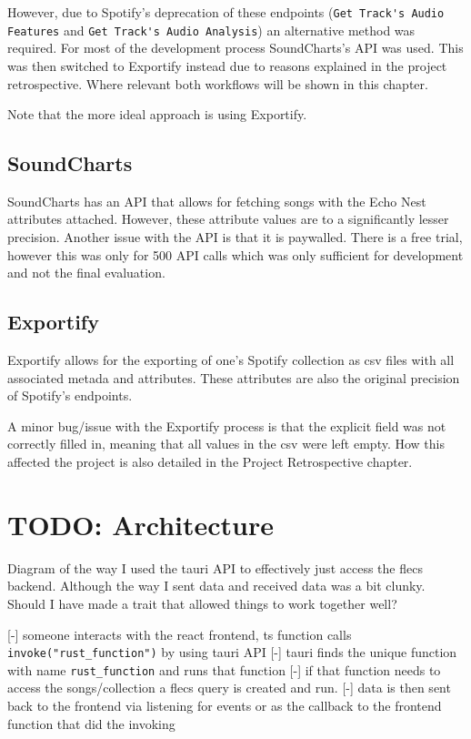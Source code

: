 However, due to Spotify's deprecation of these endpoints (\lstinline|Get Track's Audio Features| and \lstinline|Get Track's Audio Analysis|) an alternative method was required. For most of the development process SoundCharts's API was used. This was then switched to Exportify instead due to reasons explained in the project retrospective. Where relevant both workflows will be shown in this chapter.

Note that the more ideal approach is using Exportify.

\subsection{SoundCharts}
SoundCharts has an API that allows for fetching songs with the Echo Nest attributes attached. However, these attribute values are to a significantly lesser precision. Another issue with the API is that it is paywalled. There is a free trial, however this was only for 500 API calls which was only sufficient for development and not the final evaluation.

\subsection{Exportify}
Exportify allows for the exporting of one's Spotify collection as csv files with all associated metada and attributes. These attributes are also the original precision of Spotify's endpoints.

A minor bug/issue with the Exportify process is that the explicit field was not correctly filled in, meaning that all values in the csv were left empty. How this affected the project is also detailed in the Project Retrospective chapter.

\section{TODO: Architecture}%
Diagram of the way I used the tauri API to effectively just access the flecs backend. Although the way I sent data and received data was a bit clunky. Should I have made a trait that allowed things to work together well?

[-] someone interacts with the react frontend, ts function calls \texttt{invoke("rust\_function")} by using tauri API
[-] tauri finds the unique function with name \texttt{rust\_function} and runs that function
[-] if that function needs to access the songs/collection a flecs query is created and run.
[-] data is then sent back to the frontend via listening for events or as the callback to the frontend function that did the invoking

